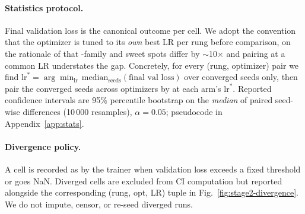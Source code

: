 \paragraph{Statistics protocol.}
Final validation loss is the canonical outcome per cell. We adopt the convention that the optimizer is tuned to its \emph{own} best LR per rung before comparison, on the rationale of \citet{wen2025fantastic} that \optMuon-family and \optAdamW{} sweet spots differ by $\sim$10$\times$ and pairing at a common LR understates the gap. Concretely, for every (rung, optimizer) pair we find $\mathrm{lr}^* = \arg\min_{\mathrm{lr}}\,\mathrm{median}_{\text{seeds}}(\text{final val loss})$ over converged seeds only, then pair the converged seeds across optimizers by  at each arm's $\mathrm{lr}^*$. Reported confidence intervals are 95\% percentile bootstrap on the \emph{median} of paired seed-wise differences (10\,000 resamples), $\alpha = 0.05$; pseudocode in Appendix~\ref{app:stats}.

\paragraph{Divergence policy.}
A cell is recorded as  by the trainer when validation loss exceeds a fixed threshold or goes NaN. Diverged cells are excluded from CI computation but reported alongside the corresponding (rung, opt, LR) tuple in Fig.~\ref{fig:stage2-divergence}. We do not impute, censor, or re-seed diverged runs.
